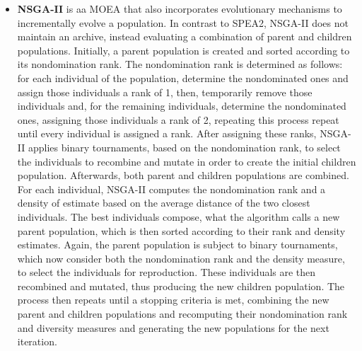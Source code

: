 \begin{itemize}
	\item \textbf{NSGA-II} \cite{Deb2002} is aa \ac{MOEA} that also incorporates evolutionary mechanisms to incrementally evolve a population. In contrast to SPEA2, NSGA-II does not maintain an archive, instead evaluating a combination of parent and children populations. Initially, a parent population is created and sorted according to its nondomination rank. The nondomination rank is determined as follows: for each individual of the population, determine the nondominated ones and assign those individuals a rank of 1, then, temporarily remove those individuals and, for the remaining individuals, determine the nondominated ones, assigning those individuals a rank of 2, repeating this process repeat until every individual is assigned a rank. After assigning these ranks, NSGA-II applies binary tournaments, based on the nondomination rank, to select the individuals to recombine and mutate in order to create the initial children population. Afterwards, both parent and children populations are combined. For each individual, NSGA-II computes the nondomination rank and a density of estimate based on the average distance of the two closest individuals. The best individuals compose, what the algorithm calls a new parent population, which is then sorted according to their rank and density estimates. Again, the parent population is subject to binary tournaments, which now consider both the nondomination rank and the density measure, to select the individuals for reproduction. These individuals are then recombined and mutated, thus producing the new children population. The process then repeats until a stopping criteria is met, combining the new parent and children populations and recomputing their nondomination rank and diversity measures and generating the new populations for the next iteration.
	

\end{itemize}

